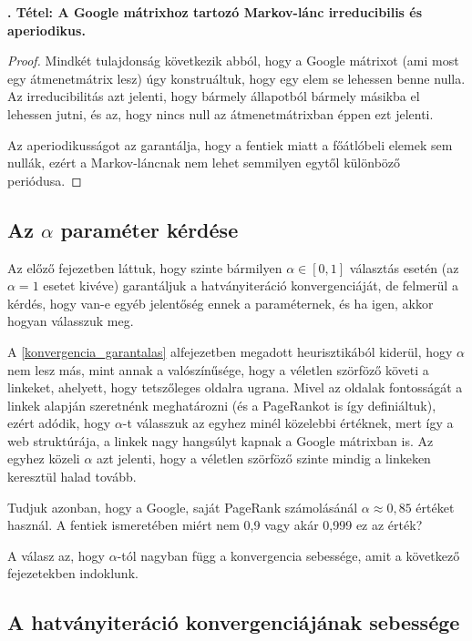 \documentclass[12pt,a4paper]{article}
\newcounter{tszam}
\newenvironment{tetel}[1]
{{\medskip}\noindent \stepcounter{tszam}
{\bfseries{\thetszam. Tétel: #1\\[1ex]}}}{\bigskip }
\begin{document}
\begin{tetel}
	{A Google mátrixhoz tartozó Markov-lánc irreducibilis és aperiodikus.}
\end{tetel}
\vspace{-1cm}
\begin{proof}
	Mindkét tulajdonság következik abból, hogy a Google mátrixot (ami most egy átmenetmátrix lesz) úgy konstruáltuk, hogy egy elem se lehessen benne nulla. Az irreducibilitás azt jelenti, hogy bármely állapotból bármely másikba el lehessen jutni, és az, hogy nincs null az átmenetmátrixban éppen ezt jelenti. 
	
	Az aperiodikusságot az garantálja, hogy a fentiek miatt a főátlóbeli elemek sem nullák, ezért a Markov-láncnak nem lehet semmilyen egytől különböző periódusa.
\end{proof}


\subsection{Az $\alpha$ paraméter kérdése}

Az előző fejezetben láttuk, hogy szinte bármilyen $\alpha \in [0,1]$ választás esetén (az $\alpha=1$ esetet kivéve) garantáljuk a hatványiteráció konvergenciáját, de felmerül a kérdés, hogy van-e egyéb jelentőség ennek a paraméternek, és ha igen, akkor hogyan válasszuk meg.

A \ref{konvergencia_garantalas} alfejezetben megadott heurisztikából kiderül, hogy $\alpha$ nem lesz más, mint annak a valószínűsége, hogy a véletlen szörföző követi a linkeket, ahelyett, hogy tetszőleges oldalra ugrana. Mivel az oldalak fontosságát a linkek alapján szeretnénk meghatározni (és a PageRankot is így definiáltuk), ezért adódik, hogy $\alpha$-t válasszuk az egyhez minél közelebbi értéknek, mert így a web struktúrája, a linkek nagy hangsúlyt kapnak a Google mátrixban is. Az egyhez közeli $\alpha$ azt jelenti, hogy a véletlen szörföző szinte mindig a linkeken keresztül halad tovább.

Tudjuk azonban, hogy a Google, saját PageRank számolásánál $\alpha \approx 0,85$ \cite{lang2} értéket használ. A fentiek ismeretében miért nem 0,9 vagy akár 0,999 ez az érték? 

A válasz az, hogy $\alpha$-tól nagyban függ a konvergencia sebessége, amit a következő fejezetekben indoklunk.

\subsection{A hatványiteráció konvergenciájának sebessége}\label{konvergencia_sebesseg}
\end{document}
